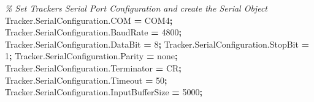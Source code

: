\documentclass[
  a4paper,
  twoside,
  titlepage,
  12pt]{article}
\newenvironment{Shaded}{\begin{snugshade}}{\end{snugshade}}
\newcommand{\CommentTok}[1]{\textcolor[rgb]{0.56,0.35,0.01}{\textit{#1}}}
\newcommand{\FloatTok}[1]{\textcolor[rgb]{0.00,0.00,0.81}{#1}}
\newcommand{\NormalTok}[1]{#1}
\newcommand{\OperatorTok}[1]{\textcolor[rgb]{0.81,0.36,0.00}{\textbf{#1}}}
\newcommand{\SpecialStringTok}[1]{\textcolor[rgb]{0.31,0.60,0.02}{#1}}
\newcommand{\VariableTok}[1]{\textcolor[rgb]{0.00,0.00,0.00}{#1}}
\numberwithin{equation}{section}
\numberwithin{figure}{section}
\numberwithin{table}{section}
\begin{document}
\begin{Shaded}
\begin{Highlighting}[]
\CommentTok{\% Set Tracker\textquotesingle{}s Serial Port Configuration and create the Serial Object}
\VariableTok{Tracker}\NormalTok{.}\VariableTok{SerialConfiguration}\NormalTok{.}\VariableTok{COM}             \OperatorTok{=} \SpecialStringTok{\textquotesingle{}COM4\textquotesingle{}}\OperatorTok{;}
\VariableTok{Tracker}\NormalTok{.}\VariableTok{SerialConfiguration}\NormalTok{.}\VariableTok{BaudRate}        \OperatorTok{=} \FloatTok{4800}\OperatorTok{;}
\VariableTok{Tracker}\NormalTok{.}\VariableTok{SerialConfiguration}\NormalTok{.}\VariableTok{DataBit}         \OperatorTok{=} \FloatTok{8}\OperatorTok{;}
\VariableTok{Tracker}\NormalTok{.}\VariableTok{SerialConfiguration}\NormalTok{.}\VariableTok{StopBit}         \OperatorTok{=} \FloatTok{1}\OperatorTok{;}
\VariableTok{Tracker}\NormalTok{.}\VariableTok{SerialConfiguration}\NormalTok{.}\VariableTok{Parity}          \OperatorTok{=} \SpecialStringTok{\textquotesingle{}none\textquotesingle{}}\OperatorTok{;}
\VariableTok{Tracker}\NormalTok{.}\VariableTok{SerialConfiguration}\NormalTok{.}\VariableTok{Terminator}      \OperatorTok{=} \SpecialStringTok{\textquotesingle{}CR\textquotesingle{}}\OperatorTok{;}
\VariableTok{Tracker}\NormalTok{.}\VariableTok{SerialConfiguration}\NormalTok{.}\VariableTok{Timeout}         \OperatorTok{=} \FloatTok{50}\OperatorTok{;}
\VariableTok{Tracker}\NormalTok{.}\VariableTok{SerialConfiguration}\NormalTok{.}\VariableTok{InputBufferSize} \OperatorTok{=} \FloatTok{5000}\OperatorTok{;}


\end{Highlighting}
\end{Shaded}
\end{document}
